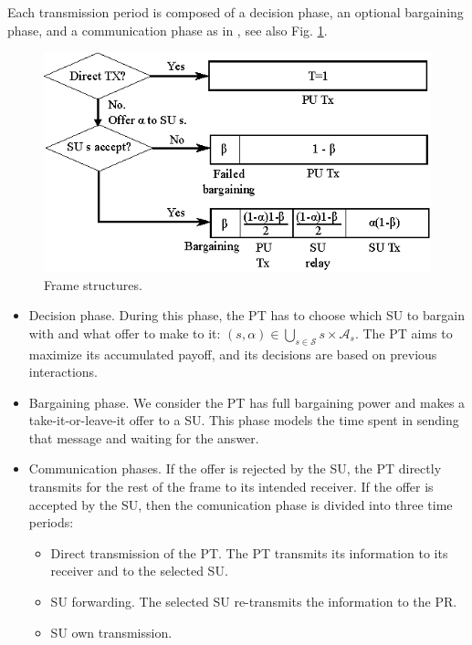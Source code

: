 Each transmission period is composed of a decision phase, an optional bargaining phase, and a communication phase as in \cite{ref:Simeone2008,ref:Yan2013}, see also Fig. \ref{fig:phase}. 

\begin{figure}[!t]
\centering
\includegraphics{phase.eps}
\caption{Frame structures.}
\label{fig:phase}
\end{figure}

\begin{itemize}
\item Decision phase. During this phase, the PT has to choose which SU to bargain with and what offer to make to it: $(s,\alpha)\in\underset{s\in\mathcal{S}}\bigcup s\times\mathcal{A}_s$. The PT aims to maximize its accumulated payoff, and its decisions are based on previous interactions.
\item Bargaining phase. We consider the PT has full bargaining power and makes a take-it-or-leave-it offer to a SU. This phase models the time spent in sending that message and waiting for the answer. 
\item Communication phases. If the offer is rejected by the SU, the PT directly transmits for the rest of the frame to its intended receiver. 
If the offer is accepted by the SU, then the comunication phase is divided into three time periods: 
\begin{itemize}
\item Direct transmission of the PT. The PT transmits its information to its receiver and to the selected SU.
\item SU forwarding. The selected SU re-transmits the information to the PR.
\item SU own transmission.
\end{itemize}
\end{itemize}

